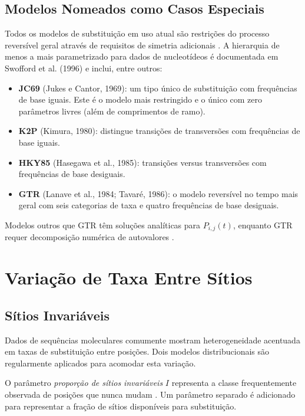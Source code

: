 \subsection{Modelos Nomeados como Casos Especiais}

Todos os modelos de substituição em uso atual são restrições do processo reversível geral através de requisitos de simetria adicionais \parencite{wheeler2012}. A hierarquia de menos a mais parametrizado para dados de nucleotídeos é documentada em Swofford et al. (1996) e inclui, entre outros:

\begin{itemize}
    \item \textbf{JC69} (Jukes e Cantor, 1969): um tipo único de substituição com frequências de base iguais. Este é o modelo mais restringido e o único com zero parâmetros livres (além de comprimentos de ramo).
    \item \textbf{K2P} (Kimura, 1980): distingue transições de transversões com frequências de base iguais.
    \item \textbf{HKY85} (Hasegawa et al., 1985): transições versus transversões com frequências de base desiguais.
    \item \textbf{GTR} (Lanave et al., 1984; Tavaré, 1986): o modelo reversível no tempo mais geral com seis categorias de taxa e quatro frequências de base desiguais.
\end{itemize}

Modelos outros que GTR têm soluções analíticas para $P_{i,j}(t)$, enquanto GTR requer decomposição numérica de autovalores \parencite{wheeler2012}.

\section{Variação de Taxa Entre Sítios}

\subsection{Sítios Invariáveis}

Dados de sequências moleculares comumente mostram heterogeneidade acentuada em taxas de substituição entre posições. Dois modelos distribucionais são regularmente aplicados para acomodar esta variação.

O parâmetro \textit{proporção de sítios invariáveis} $I$ representa a classe frequentemente observada de posições que nunca mudam \parencite{hasegawa1985}. Um parâmetro separado é adicionado para representar a fração de sítios disponíveis para substituição.


